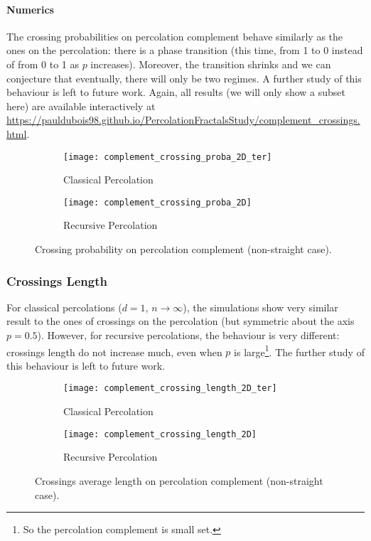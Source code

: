 \paragraph{Numerics}
The crossing probabilities on percolation complement behave similarly as the ones on the percolation: there is a phase transition (this time, from 1 to 0 instead of from 0 to 1 as $p$ increases).
Moreover, the transition shrinks and we can conjecture that eventually, there will only be two regimes.
A further study of this behaviour is left to future work.
Again, all results (we will only show a subset here) are available interactively at \url{https://pauldubois98.github.io/PercolationFractalsStudy/complement_crossings.html}.

\begin{figure}[!h]
	\begin{subfigure}{0.44\linewidth}
		\texttt{[image: complement\_crossing\_proba\_2D\_ter]}
		\centering
		\captionsetup{justification=centering}
		\caption{Classical Percolation}
	\end{subfigure}
	\hspace{0.1 \linewidth}
	\begin{subfigure}{0.44\linewidth}
		\texttt{[image: complement\_crossing\_proba\_2D]}
		\centering
		\captionsetup{justification=centering}
		\caption{Recursive Percolation}
	\end{subfigure}
	\caption{Crossing probability on percolation complement (non-straight case).}
	\label{fig:crossingComplementProbabilities}
\end{figure}

\subsubsection{Crossings Length}
For classical percolations ($d=1$, $n \to \infty$), the simulations show very similar result to the ones of crossings on the percolation (but symmetric about the axis $p=0.5$).
However, for recursive percolations, the behaviour is very different: crossings length do not increase much, even when $p$ is large\footnote{So the percolation complement is small set.}.
The further study of this behaviour is left to future work.

\begin{figure}[!h]
	\begin{subfigure}{0.44\linewidth}
		\texttt{[image: complement\_crossing\_length\_2D\_ter]}
		\centering
		\captionsetup{justification=centering}
		\caption{Classical Percolation}
	\end{subfigure}
	\hspace{0.1 \linewidth}
	\begin{subfigure}{0.44\linewidth}
		\texttt{[image: complement\_crossing\_length\_2D]}
		\centering
		\captionsetup{justification=centering}
		\caption{Recursive Percolation}
	\end{subfigure}
	\caption{Crossings average length on percolation complement (non-straight case).}
	\label{fig:crossingComplementLengths}
\end{figure}

